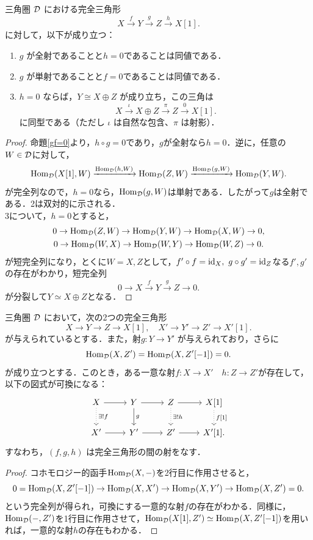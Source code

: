 \begin{cor}
三角圏 ${\mathcal D}$ における完全三角形
\[
X \xrightarrow{f} Y \xrightarrow{g} Z \xrightarrow{h} X[1].
\]
に対して，以下が成り立つ：

\begin{enumerate}
  \item $g$ が全射であることと$h = 0$であることは同値である．
  \item $g$ が単射であることと$f = 0$であることは同値である．
  \item $h = 0$ ならば，$Y \cong X \oplus Z$ が成り立ち，この三角は
  \[
  X \xrightarrow{\iota} X \oplus Z \xrightarrow{\pi} Z \xrightarrow{0} X[1].
  \]
  に同型である（ただし $\iota$ は自然な包含、$\pi$ は射影）．
\end{enumerate}
\end{cor}
\begin{proof}
	命題\ref{gf=0}より，$h\circ g = 0$であり，$g$が全射なら$h=0$．逆に，任意の$W\in{\mathcal D}$に対して，
\[
	\operatorname{\mathrm{Hom}}_{{\mathcal D}}(X[1],W)\xrightarrow{\operatorname{\mathrm{Hom}}_{{\mathcal D}}(h,W)}\operatorname{\mathrm{Hom}}_{{\mathcal D}}(Z,W)\xrightarrow{\operatorname{\mathrm{Hom}}_{{\mathcal D}}(g,W)}\operatorname{\mathrm{Hom}}_{{\mathcal D}}(Y,W).
\]	
が完全列なので，$h=0$なら，$\operatorname{\mathrm{Hom}}_{{\mathcal D}}(g,W)$は単射である．したがって$g$は全射である．2は双対的に示される．\\
3について，$h=0$とすると，
\begin{gather*}
	0\rightarrow\operatorname{\mathrm{Hom}}_{{\mathcal D}}(Z,W)\rightarrow\operatorname{\mathrm{Hom}}_{{\mathcal D}}(Y,W)\rightarrow\operatorname{\mathrm{Hom}}_{{\mathcal D}}(X,W)\rightarrow 0,\\
	0\rightarrow\operatorname{\mathrm{Hom}}_{{\mathcal D}}(W,X)\rightarrow\operatorname{\mathrm{Hom}}_{{\mathcal D}}(W,Y)\rightarrow\operatorname{\mathrm{Hom}}_{{\mathcal D}}(W,Z)\rightarrow 0.
\end{gather*}
が短完全列になり，とくに$W=X,Z$として，$f'\circ f =\mathrm{id}_X,\ g\circ g'=\mathrm{id}_Z$なる$f',g'$の存在がわかり，短完全列
\[
0\rightarrow X \xrightarrow{f} Y \xrightarrow{g} Z\rightarrow 0 .
\]
が分裂して$Y\simeq X\oplus Z$となる．
\end{proof}

\begin{prop}\cite[p.247]{KS06}
三角圏 ${\mathcal D}$ において，次の2つの完全三角形
\[
X \rightarrow Y \rightarrow Z \rightarrow X[1], \quad
X' \rightarrow Y' \rightarrow Z' \rightarrow X'[1].
\]
が与えられているとする．また，射$g\colon Y\to Y'$ が与えられており，さらに
\[
\operatorname{\mathrm{Hom}}_{{\mathcal D}}(X, Z') = \operatorname{\mathrm{Hom}}_{{\mathcal D}}(X, Z'[-1]) = 0.
\]
が成り立つとする．このとき，ある一意な射$f\colon X\to X'\quad h\colon Z\to Z'$が存在して，以下の図式が可換になる：
\[
\begin{tikzcd}
	X \arrow{r} \arrow[dotted]{d}{\exists !f} & Y \arrow{r} \arrow{d}{ g} & Z \arrow{r} \arrow[dotted]{d}{\exists !h} & X[1] \arrow[dotted]{d}{f[1]} \\
X' \arrow{r} & Y' \arrow{r} & Z' \arrow{r} & X'[1].
\end{tikzcd}
\]
すなわち，$(f,g,h)$ は完全三角形の間の射をなす．
\end{prop}
\begin{proof}
	コホモロジー的函手$\operatorname{\mathrm{Hom}}_{{\mathcal D}}(X,-)$を2行目に作用させると，
	\[0=\operatorname{\mathrm{Hom}}_{{\mathcal D}}(X,Z'[-1])\rightarrow \operatorname{\mathrm{Hom}}_{{\mathcal D}}(X,X') \rightarrow \operatorname{\mathrm{Hom}}_{{\mathcal D}}(X,Y') \rightarrow \operatorname{\mathrm{Hom}}_{{\mathcal D}}(X,Z')=0.\]
	という完全列が得られ，可換にする一意的な射$f$の存在がわかる．同様に，$\operatorname{\mathrm{Hom}}_{{\mathcal D}}(-,Z')$を1行目に作用させて，$\operatorname{\mathrm{Hom}}_{{\mathcal D}}(X[1],Z')\simeq \operatorname{\mathrm{Hom}}_{{\mathcal D}}(X,Z'[-1])$を用いれば，一意的な射$h$の存在もわかる．

\end{proof}
